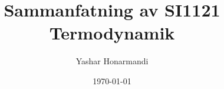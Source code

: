 \documentclass[a4paper, 11pt]{article}
\title{Sammanfatning av SI1121 Termodynamik}
\author{Yashar Honarmandi}
\date{\today}
\begin{document}
\sloppy

\maketitle

\begin{abstract}
	
\end{abstract}

\thispagestyle{empty}

\newpage

\tableofcontents

\newpage







\end{document}

